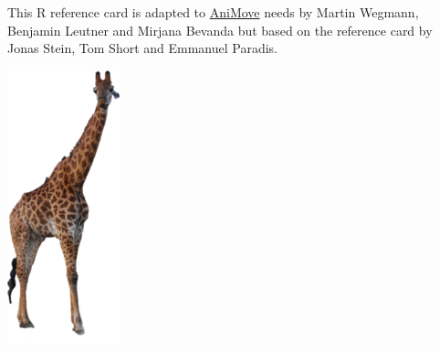 \documentclass[8pt,landscape]{article}
\begin{document}
\begin{multicols*}{3}
This R reference card is adapted to \href{mailto:contact@animove.org}{AniMove} needs by Martin Wegmann, Benjamin Leutner and Mirjana Bevanda but based on the reference card by Jonas Stein, Tom Short and Emmanuel Paradis.

% 
% 
\begin{center}
 \includegraphics[width=.13\textwidth]{pics/earth-observation_org_WegmannBevanda_giraffe.png}
\end{center}

  
\end{multicols*}
\end{document}

